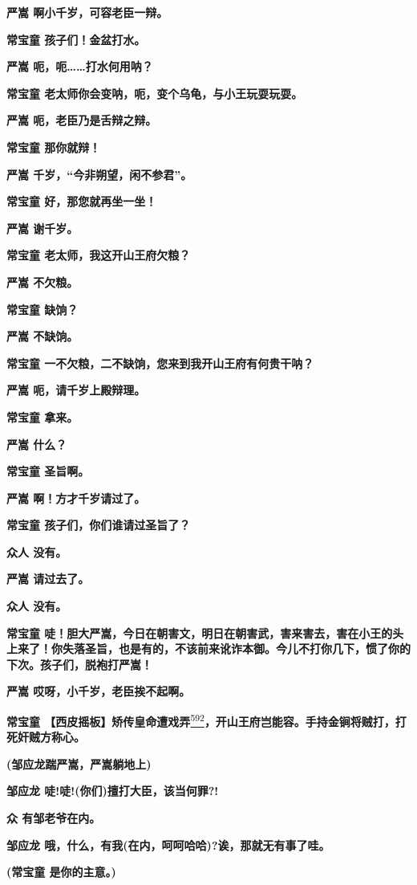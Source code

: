\textbf{严嵩 啊小千岁，可容老臣一辩。}

\textbf{常宝童 孩子们！金盆打水。}

\textbf{严嵩 呃，呃\ldots{}\ldots{}打水何用呐？}

\textbf{常宝童 老太师你会变呐，呃，变个乌龟，与小王玩耍玩耍。}

\textbf{严嵩 呃，老臣乃是舌辩之辩。}

\textbf{常宝童 那你就辩！}

\textbf{严嵩 千岁，``今非朔望，闲不参君''。}

\textbf{常宝童 好，那您就再坐一坐！}

\textbf{严嵩 谢千岁。}

\textbf{常宝童 老太师，我这开山王府欠粮？}

\textbf{严嵩 不欠粮。}

\textbf{常宝童 缺饷？}

\textbf{严嵩 不缺饷。}

\textbf{常宝童 一不欠粮，二不缺饷，您来到我开山王府有何贵干呐？}

\textbf{严嵩 呃，请千岁上殿辩理。}

\textbf{常宝童 拿来。}

\textbf{严嵩 什么？}

\textbf{常宝童 圣旨啊。}

\textbf{严嵩 啊！方才千岁请过了。}

\textbf{常宝童 孩子们，你们谁请过圣旨了？}

\textbf{众人 没有。}

\textbf{严嵩 请过去了。}

\textbf{众人 没有。}

\textbf{常宝童
唗！胆大严嵩，今日在朝害文，明日在朝害武，害来害去，害在小王的头上来了！你失落圣旨，也是有的，不该前来讹诈本御。今儿不打你几下，惯了你的下次。孩子们，脱袍打严嵩！}

\textbf{严嵩 哎呀，小千岁，老臣挨不起啊。}

\textbf{常宝童
【西皮摇板】矫传皇命遭戏弄}\protect\hyperlink{fn592}{\textsuperscript{592}}\textbf{，开山王府岂能容。手持金锏将贼打，打死奸贼方称心。}

\textbf{(邹应龙踹严嵩，严嵩躺地上)}

\textbf{邹应龙 唗!唗!(你们)擅打大臣，该当何罪?!}

\textbf{众 有邹老爷在内。}

\textbf{邹应龙 哦，什么，有我(在内，呵呵哈哈)?诶，那就无有事了哇。}

\textbf{(常宝童 是你的主意。)}

